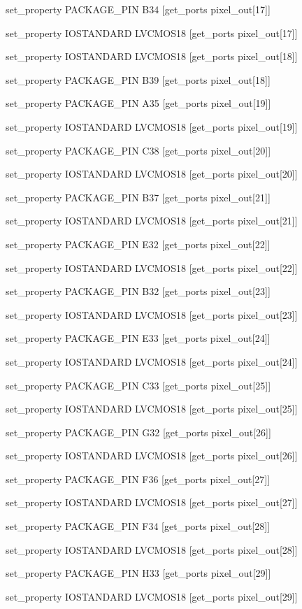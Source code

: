 set\_property PACKAGE\_PIN B34 [get\_ports {pixel\_out[17]}]

set\_property IOSTANDARD LVCMOS18 [get\_ports {pixel\_out[17]}]

set\_property IOSTANDARD LVCMOS18 [get\_ports {pixel\_out[18]}]

set\_property PACKAGE\_PIN B39 [get\_ports {pixel\_out[18]}]

set\_property PACKAGE\_PIN A35 [get\_ports {pixel\_out[19]}]

set\_property IOSTANDARD LVCMOS18 [get\_ports {pixel\_out[19]}]

set\_property PACKAGE\_PIN C38 [get\_ports {pixel\_out[20]}]

set\_property IOSTANDARD LVCMOS18 [get\_ports {pixel\_out[20]}]

set\_property PACKAGE\_PIN B37 [get\_ports {pixel\_out[21]}]

set\_property IOSTANDARD LVCMOS18 [get\_ports {pixel\_out[21]}]

set\_property PACKAGE\_PIN E32 [get\_ports {pixel\_out[22]}]

set\_property IOSTANDARD LVCMOS18 [get\_ports {pixel\_out[22]}]

set\_property PACKAGE\_PIN B32 [get\_ports {pixel\_out[23]}]

set\_property IOSTANDARD LVCMOS18 [get\_ports {pixel\_out[23]}]

set\_property PACKAGE\_PIN E33 [get\_ports {pixel\_out[24]}]

set\_property IOSTANDARD LVCMOS18 [get\_ports {pixel\_out[24]}]

set\_property PACKAGE\_PIN C33 [get\_ports {pixel\_out[25]}]

set\_property IOSTANDARD LVCMOS18 [get\_ports {pixel\_out[25]}]

set\_property PACKAGE\_PIN G32 [get\_ports {pixel\_out[26]}]

set\_property IOSTANDARD LVCMOS18 [get\_ports {pixel\_out[26]}]

set\_property PACKAGE\_PIN F36 [get\_ports {pixel\_out[27]}]

set\_property IOSTANDARD LVCMOS18 [get\_ports {pixel\_out[27]}]

set\_property PACKAGE\_PIN F34 [get\_ports {pixel\_out[28]}]

set\_property IOSTANDARD LVCMOS18 [get\_ports {pixel\_out[28]}]

set\_property PACKAGE\_PIN H33 [get\_ports {pixel\_out[29]}]

set\_property IOSTANDARD LVCMOS18 [get\_ports {pixel\_out[29]}]

